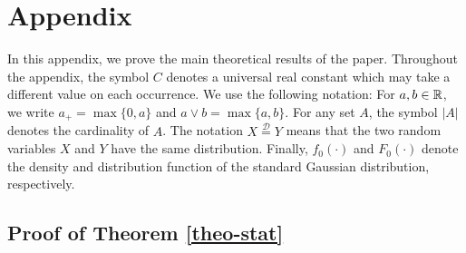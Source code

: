 \documentclass[a4paper,12pt]{article}
\numberwithin{equation}{section}
\begin{document}
\newpage
\section*{Appendix}

\def\theequation{A.\arabic{equation}}
\setcounter{equation}{0}
\allowdisplaybreaks[3]


In this appendix, we prove the main theoretical results of the paper. Throughout the appendix, the symbol $C$ denotes a universal real constant which may take a different value on each occurrence. We use the following notation: For $a,b \in \mathbb{R}$, we write $a_+ = \max \{0,a\}$ and $a \vee b = \max\{a,b\}$. For any set $A$, the symbol $|A|$ denotes the cardinality of $A$. The notation $X \stackrel{\mathcal{D}}{=} Y$ means that the two random variables $X$ and $Y$ have the same distribution. Finally, $f_0(\cdot)$ and $F_0(\cdot)$ denote the density and distribution function of the standard Gaussian distribution, respectively.



\subsection*{Proof of Theorem \ref{theo-stat}}
\end{document}
